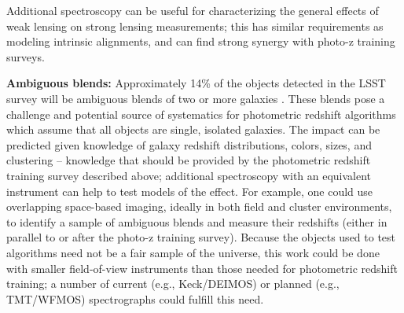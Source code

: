 Additional spectroscopy can be useful for characterizing the general effects of weak lensing on  strong lensing measurements; this has similar
requirements as modeling intrinsic alignments, and can find strong
synergy with photo-z training surveys.

%


{\bf Ambiguous blends:}
Approximately 14\% of the objects detected in the LSST survey will be ambiguous blends of two or more galaxies \citep{Dawson}. These  blends pose a challenge and potential source of systematics for photometric redshift algorithms which assume that all objects are single, isolated galaxies.
The impact can be predicted given knowledge of galaxy redshift distributions, colors, sizes, and clustering -- knowledge that should be provided by the photometric redshift training survey described above; additional spectroscopy with an equivalent instrument can help to test models of the effect.  For example, one could use overlapping space-based imaging, ideally in both field and cluster environments, to identify a sample of ambiguous blends and measure their redshifts (either in parallel to or after the photo-z training survey).  Because the objects used to test algorithms need not be a fair sample of the universe, this work could be done with smaller field-of-view instruments than those needed for photometric redshift training; a number of current (e.g., Keck/DEIMOS) or planned (e.g., TMT/WFMOS) spectrographs could fulfill this need.

